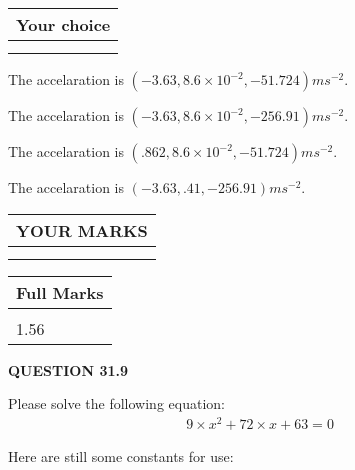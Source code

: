 \documentclass[12pt]{article}
\begin{document}
  
\noindent\hspace{3.0in} \begin{tabular}{|l|}
\hline
Your choice \\
\hline
 \\ 
 \\ 
\hline
\end{tabular}
  
  
 
 
  The accelaration is $  %
(
-3.63,
8.6 \times 10^{-2},
-51.724)
ms^{-2} $.
 
 
  The accelaration is $  %
(
-3.63,
8.6 \times 10^{-2},
-256.91)
ms^{-2} $.
 
 
  The accelaration is $  %
(
.862,
8.6 \times 10^{-2},
-51.724)
ms^{-2} $.
 
 
  The accelaration is $  %
(
-3.63,
.41,
-256.91)
ms^{-2} $.
 
 
 

 
 
\vspace{0.3in}
  
\vspace{0.2in}
  
\noindent\begin{tabular}{|l|}
\hline
 YOUR MARKS  \\
\hline
 \\ 
 \\ 
\hline
\end{tabular}
\hspace{0.05in} \begin{tabular}{|l|}
\hline
 Full Marks  \\
\hline
 \\ 
1.56 \\
\hline
\end{tabular}
{\textbf{\Large{QUESTION
31.9 
}}}
  
  
 
 

 
Please solve the following equation:
\begin{eqnarray*}
9 \times x^2  %
+  %
72
                 \times x    %
+  %
63 =0
\end{eqnarray*}
 

 

 
\vspace{0.3in}
   
   
 \vspace{0.2in}
Here are still some constants for use:
 
\end{document}
